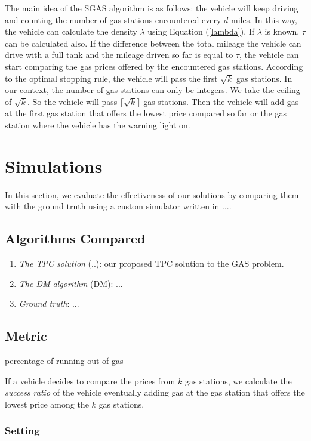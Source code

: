 \documentclass[conference]{IEEEtran}
\theoremstyle{definition}
\begin{document}
The main idea of the SGAS algorithm is as follows: the vehicle will keep driving and counting the number of gas stations encountered every $d$ miles. In this way, the vehicle can calculate the density $\lambda$ using Equation (\ref{lambda}). If $\lambda$ is known, $\tau$ can be calculated also. If the difference between the total mileage the vehicle can drive with a full tank and the mileage driven so far is equal to $\tau$, the vehicle can start comparing the gas prices offered by the encountered gas stations. According to the optimal stopping rule, the vehicle will pass the first $\sqrt{k}$ gas stations. In our context, the number of gas stations can only be integers. We take the ceiling of $\sqrt{k}$. So the vehicle will pass $\lceil\sqrt{k}\rceil$ gas stations. Then the vehicle will add gas at the first gas station that offers the lowest price compared so far or the gas station where the vehicle has the warning light on.

\section{Simulations} \label{simulations}
In this section, we evaluate the effectiveness of our solutions by comparing them with the ground truth using a custom simulator written in ....

\subsection{Algorithms Compared}
\begin{enumerate}
\item {\em The TPC solution} (..): our proposed TPC solution to the GAS problem.
\item {\em The DM algorithm} (DM):  ...
\item {\em Ground truth}: ...
\end{enumerate}

\subsection{Metric}
{\color{red} percentage of running out of gas}

If a vehicle decides to compare the prices from $k$ gas stations, we calculate the {\em success ratio} of the vehicle eventually adding gas at the gas station that offers the lowest price among the $k$ gas stations.

\subsubsection{Setting}
\end{document}
